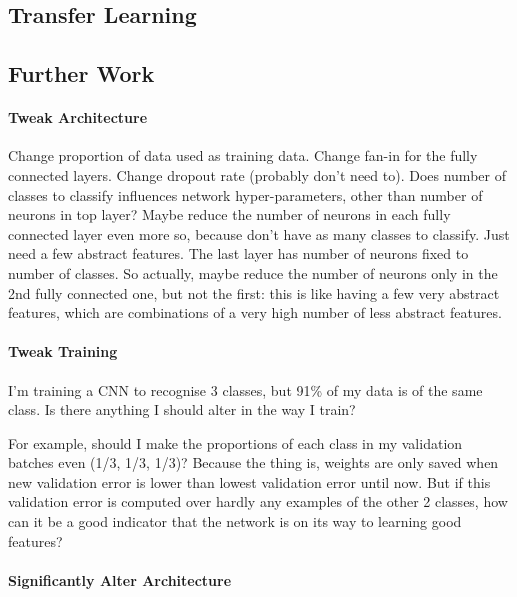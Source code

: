 \documentclass[a4paper,11pt]{article}
\begin{document}
\subsection{Transfer Learning}

\subsection{Further Work}

\paragraph{Tweak Architecture}

Change proportion of data used as training data.
Change fan-in for the fully connected layers.
Change dropout rate (probably don't need to).
Does number of classes to classify influences network hyper-parameters, other than number of neurons in top layer?
Maybe reduce the number of neurons in each fully connected layer even more so, because don't have as many classes to classify. Just need a few abstract features. The last layer has number of neurons fixed to number of classes. So actually, maybe reduce the number of neurons only in the 2nd fully connected one, but not the first: this is like having a few very abstract features, which are combinations of a very high number of less abstract features.

\paragraph{Tweak Training}

I'm training a CNN to recognise 3 classes, but 91\% of my data is of the same class. Is there anything I should alter in the way I train?

For example, should I make the proportions of each class in my validation batches even (1/3, 1/3, 1/3)? Because the thing is, weights are only saved when new validation error is lower than lowest validation error until now. But if this validation error is computed over hardly any examples of the other 2 classes, how can it be a good indicator that the network is on its way to learning good features?﻿

\paragraph{Significantly Alter Architecture}
\end{document}
